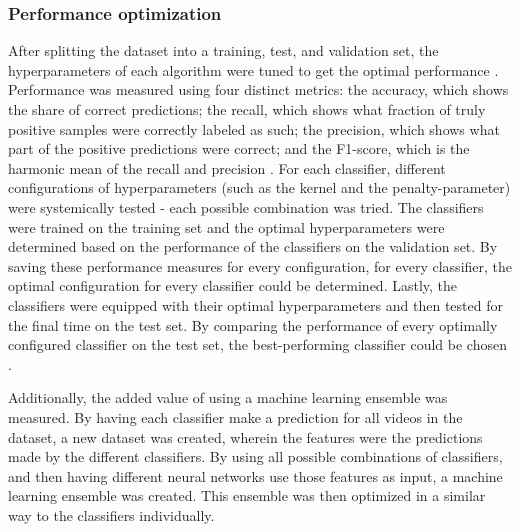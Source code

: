 \documentclass[../main.tex]{subfiles}
\begin{document}
\subsubsection{Performance optimization}
After splitting the dataset into a training, test, and validation set, the hyperparameters of each
algorithm were tuned to get the optimal performance \citep{feurer2019hyperparameter}. Performance was
measured using four distinct metrics: the accuracy, which shows the share of correct predictions; the
recall, which shows what fraction of truly positive samples were correctly labeled as such; the
precision, which shows what part of the positive predictions were correct; and the F1-score, which is
the harmonic mean of the recall and precision \citep{sokolova2009systematic}. For each classifier,
different configurations of hyperparameters (such as the kernel and the penalty-parameter) were
systemically tested - each possible combination was tried. The classifiers were trained on the training set
and the optimal hyperparameters were determined based on the performance of the classifiers on the validation
set. By saving these performance measures for every configuration, for every classifier, the optimal
configuration for every classifier could be determined. Lastly, the classifiers were equipped with their
optimal hyperparameters and then tested for the final time on the test set. By comparing the performance
of every optimally configured classifier on the test set, the best-performing classifier could be chosen \citep{reitermanova2010data}. 

Additionally, the added value of using a machine learning ensemble was measured. By having each
classifier make a prediction for all videos in the dataset, a new dataset was created, wherein the
features were the predictions made by the different classifiers. By using all possible combinations of
classifiers, and then having different neural networks use those features as input, a machine learning
ensemble was created. This ensemble was then optimized in a similar way to the classifiers individually.
\end{document}
